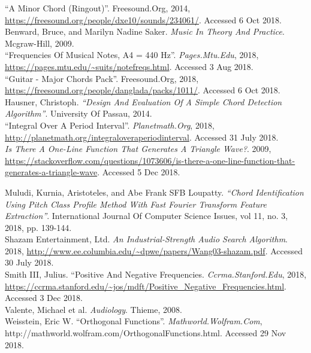 \documentclass{article}
\begin{document}
\begin{hangparas}{.25in}{1}

``A Minor Chord (Ringout)''. Freesound.Org, 2014, 
\url{https://freesound.org/people/dxe10/sounds/234061/}. Accessed 6 Oct 2018.\\

Benward, Bruce, and Marilyn Nadine Saker. 
\textit{Music In Theory And Practice}. Mcgraw-Hill, 2009. \\

``Frequencies Of Musical Notes, A4 = 440 Hz''. \textit{Pages.Mtu.Edu}, 2018, 
\url{https://pages.mtu.edu/~suits/notefreqs.html}. Accessed 3 Aug 2018. \\

``Guitar - Major Chords Pack''. Freesound.Org, 2018, 
\url{https://freesound.org/people/danglada/packs/1011/}. Accessed 6 Oct 2018. \\

Hausner, Christoph. \textit{``Design And Evaluation Of A Simple Chord 
Detection Algorithm''}. University Of Passau, 2014. \\

``Integral Over A Period Interval''. \textit{Planetmath.Org}, 2018, 
\url{http://planetmath.org/integraloveraperiodinterval}. Accessed 31 July 2018.
\\

\textit{Is There A One-Line Function That Generates A Triangle Wave?}. 2009,
\url{https://stackoverflow.com/questions/1073606/is-there-a-one-line-function-that-generates-a-triangle-wave}.
Accessed 5 Dec 2018.

Muludi, Kurnia, Aristoteles, and Abe Frank SFB Loupatty. \textit{``Chord 
Identification Using Pitch Class Profile Method With Fast Fourier Transform 
Feature Extraction''}. International Journal Of Computer Science Issues, vol 
11, no. 3, 2018, pp. 139-144. \\

Shazam Entertainment, Ltd. \textit{An Industrial-Strength Audio Search 
Algorithm}. 2018, 
\url{http://www.ee.columbia.edu/~dpwe/papers/Wang03-shazam.pdf}. 
Accessed 30 July 2018. \\

Smith III, Julius. ``Positive And Negative Frequencies.
\textit{Ccrma.Stanford.Edu}, 2018,
\url{https://ccrma.stanford.edu/~jos/mdft/Positive_Negative_Frequencies.html}.
Accessed 3 Dec 2018. \\

Valente, Michael et al. \textit{Audiology}. Thieme, 2008. \\

Weisstein, Eric W. ``Orthogonal Functions''. \textit{Mathworld.Wolfram.Com},
http://mathworld.wolfram.com/OrthogonalFunctions.html. Accessed 29 Nov 2018. \\

\end{hangparas}
\end{document}
